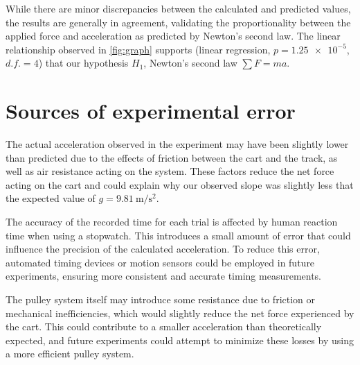 ﻿\documentclass[reprint,amsmath,amssymb,aps,twoside]{revtex4-2}
\begin{document}
While there are minor discrepancies between the calculated and predicted values, the results are generally in agreement, validating the proportionality between the applied force and acceleration as predicted by Newton's second law. The linear relationship observed in \cref{fig:graph} supports (linear regression, $p=\num{1.25e-5}$, $d.f.=4$) that our hypothesis $H_1$, Newton's second law $\sum F = ma$.

 

\section{Sources of experimental error}
The actual acceleration observed in the experiment may have been slightly lower than predicted due to the effects of friction between the cart and the track, as well as air resistance acting on the system. These factors reduce the net force acting on the cart and could explain why our observed slope was slightly less that the expected value of $g=\qty{9.81}{\meter\per\second\squared}$.

The accuracy of the recorded time for each trial is affected by human reaction time when using a stopwatch. This introduces a small amount of error that could influence the precision of the calculated acceleration. To reduce this error, automated timing devices or motion sensors could be employed in future experiments, ensuring more consistent and accurate timing measurements.

The pulley system itself may introduce some resistance due to friction or mechanical inefficiencies, which would slightly reduce the net force experienced by the cart. This could contribute to a smaller acceleration than theoretically expected, and future experiments could attempt to minimize these losses by using a more efficient pulley system.
\end{document}
